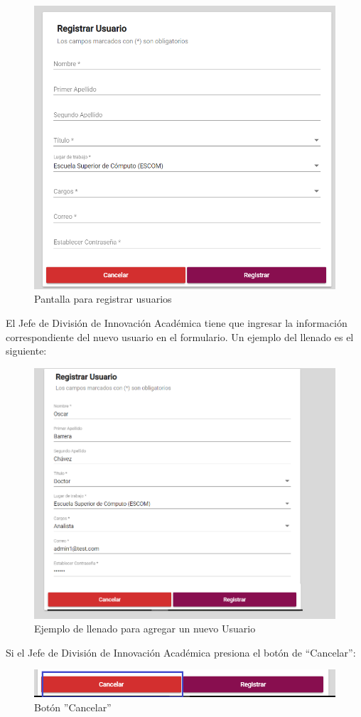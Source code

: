 \begin{figure}[H]
	\centering
	\hypertarget{registrar-Us}{\includegraphics[width=0.7\linewidth]{images/SP5/Registro-Usuario-vacio}}
	\caption{Pantalla para registrar usuarios}
	\label{registrarrh}
\end{figure}

El Jefe de División de Innovación Académica  tiene que ingresar la información correspondiente del nuevo usuario en el formulario. Un ejemplo del llenado  es el siguiente:

\begin{figure}[H]
	\centering
	\hypertarget{ejreg}{\includegraphics[width=0.7\linewidth]{images/SP5/Registro-Usuario-UA}}
	\caption{Ejemplo de llenado para agregar un nuevo Usuario}
	\label{ejreg}
\end{figure}

\newpage
Si el Jefe de División de Innovación Académica  presiona el botón de “Cancelar”:

\begin{figure}[H]
	\centering
	\hypertarget{cancel1}{\includegraphics[width=0.7\linewidth]{images/SP5/BtnCancelar1}}
	\caption{Botón ''Cancelar''}
	\label{cancel1}
\end{figure}

